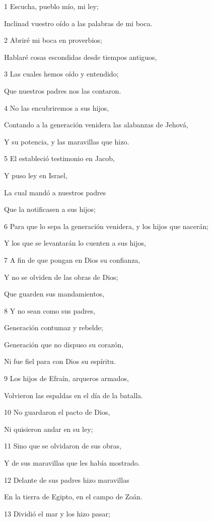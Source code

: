 \par 1 Escucha, pueblo mío, mi ley;
\par Inclinad vuestro oído a las palabras de mi boca.
\par 2 Abriré mi boca en proverbios;
\par Hablaré cosas escondidas desde tiempos antiguos,
\par 3 Las cuales hemos oído y entendido;
\par Que nuestros padres nos las contaron.
\par 4 No las encubriremos a sus hijos,
\par Contando a la generación venidera las alabanzas de Jehová,
\par Y su potencia, y las maravillas que hizo.
\par 5 El estableció testimonio en Jacob,
\par Y puso ley en Israel,
\par La cual mandó a nuestros padres
\par Que la notificasen a sus hijos;
\par 6 Para que lo sepa la generación venidera, y los hijos que nacerán;
\par Y los que se levantarán lo cuenten a sus hijos,
\par 7 A fin de que pongan en Dios su confianza,
\par Y no se olviden de las obras de Dios;
\par Que guarden sus mandamientos,
\par 8 Y no sean como sus padres,
\par Generación contumaz y rebelde;
\par Generación que no dispuso su corazón,
\par Ni fue fiel para con Dios su espíritu.
\par 9 Los hijos de Efraín, arqueros armados,
\par Volvieron las espaldas en el día de la batalla.
\par 10 No guardaron el pacto de Dios,
\par Ni quisieron andar en su ley;
\par 11 Sino que se olvidaron de sus obras,
\par Y de sus maravillas que les había mostrado.
\par 12 Delante de sus padres hizo maravillas
\par En la tierra de Egipto, en el campo de Zoán.
\par 13 Dividió el mar y los hizo pasar;
